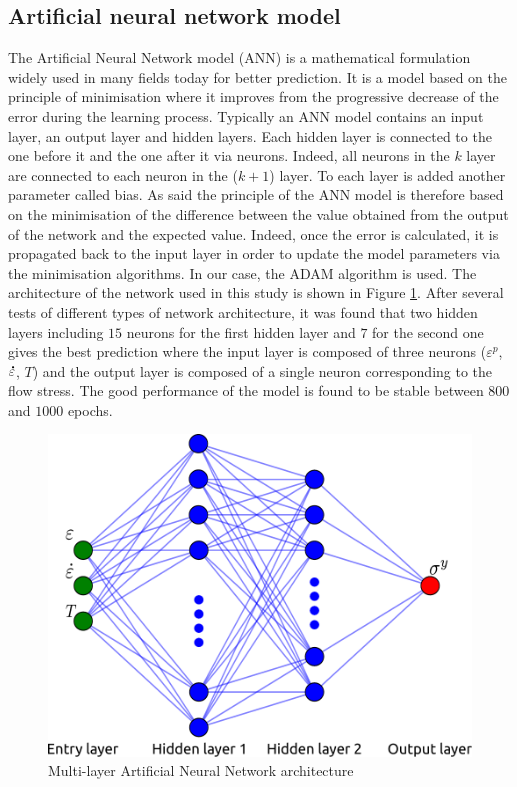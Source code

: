 \documentclass[twoside,english,1p,final,sort&compress]{elsarticle}
\theoremstyle{plain}
\newcommand{\mdot}[1]{\accentset{\mbox{\bfseries .}}{#1}}
\begin{document}
\subsection{Artificial neural network model\label{sec:ANNmodel}}
The Artificial Neural Network model (ANN) is a mathematical formulation widely used in many fields today for better prediction. It is a model based on the principle of minimisation where it improves from the progressive decrease of the error during the learning process. Typically an ANN model contains an input layer, an output layer and hidden layers. Each hidden layer is connected to the one before it and the one after it via neurons. Indeed, all neurons in the $k$ layer are connected to each neuron in the ($k+1$) layer. To each layer is added another parameter called bias. As said the principle of the ANN model is therefore based on the minimisation of the difference between the value obtained from the output of the network and the expected value.  Indeed, once the error is calculated, it is propagated back to the input layer in order to update the model parameters via the minimisation algorithms. In our case, the ADAM algorithm is used. The architecture of the network used in this study is shown in Figure \ref{fig:ANN-scheme-2HL}. After several tests of different types of network architecture, it was found that two hidden layers including $15$ neurons for the first hidden layer and $7$ for the second one gives the best prediction where the input layer is composed of three neurons ($\varepsilon^p$, $\mdot\varepsilon$, $T$) and the output layer is composed of a single neuron corresponding to the flow stress. The good performance of the model is found to be stable between $800$ and $1000$ epochs.

\begin{figure}[!ht]
\centering
\includegraphics[width=0.7\columnwidth]
{Figures/ANN-scheme-2HL}
\caption{Multi-layer Artificial Neural Network architecture}
\label{fig:ANN-scheme-2HL}
\end{figure}
\end{document}

